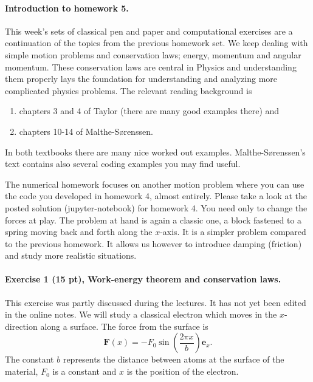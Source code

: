 \documentclass[%
oneside,                 %
final,                   %
10pt]{article}
\begin{document}
\noindent
\paragraph{Introduction to homework 5.}
This week's sets of classical pen and paper and computational
exercises are a continuation of the topics from the previous homework set. We keep dealing with simple motion problems and conservation laws; energy, momentum and angular momentum. These conservation laws are central in Physics and understanding them properly lays the foundation for understanding and analyzing more complicated physics problems.
The relevant reading background is
\begin{enumerate}
\item chapters 3 and 4 of Taylor (there are many good examples there) and

\item chapters 10-14 of Malthe-Sørenssen.
\end{enumerate}

\noindent
In both textbooks there are many nice worked out examples. Malthe-Sørenssen's text contains also several coding examples you may find useful. 

The numerical homework focuses on another motion problem where you can
use the code you developed in homework 4, almost entirely. Please take
a look at the posted solution (jupyter-notebook) for homework 4. You
need only to change the forces at play. The problem at hand is again a
classic one, a block fastened to a spring moving back and forth along the $x$-axis. It is a simpler problem compared to the previous homework. It allows us however to introduce damping (friction) and study more realistic situations. 



\paragraph{Exercise 1 (15 pt), Work-energy theorem and conservation laws.}
This exercise was partly discussed during the lectures. It has not yet been edited in the online notes.
We will study a classical electron which moves in the $x$-direction along a surface. The force from the surface is
\[
\bm{F}(x)=-F_0\sin{(\frac{2\pi x}{b})}\bm{e}_x.
\]
The constant $b$ represents the distance between atoms at the surface of the material, $F_0$ is a constant and $x$ is the position of the electron.
\end{document}
